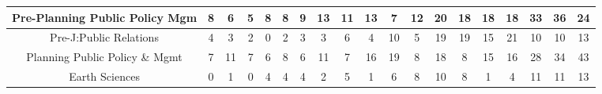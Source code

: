 \documentclass[10]{article}
\begin{document}
\begin{landscape}
\begin{longtable}[c]{|ccccccccccccccccccc|}
	\multicolumn{1}{|c|}{Pre-Planning Public Policy Mgm}             & \multicolumn{1}{c|}{8}          & \multicolumn{1}{c|}{6}          & \multicolumn{1}{c|}{5}          & \multicolumn{1}{c|}{8}          & \multicolumn{1}{c|}{8}          & \multicolumn{1}{c|}{9}          & \multicolumn{1}{c|}{13}         & \multicolumn{1}{c|}{11}         & \multicolumn{1}{c|}{13}         & \multicolumn{1}{c|}{7}          & \multicolumn{1}{c|}{12}         & \multicolumn{1}{c|}{20}         & \multicolumn{1}{c|}{18}         & \multicolumn{1}{c|}{18}         & \multicolumn{1}{c|}{18}         & \multicolumn{1}{c|}{33}         & \multicolumn{1}{c|}{36}         & 24         \\ \hline
	\multicolumn{1}{|c|}{Pre-J:Public Relations}                     & \multicolumn{1}{c|}{4}          & \multicolumn{1}{c|}{3}          & \multicolumn{1}{c|}{2}          & \multicolumn{1}{c|}{0}          & \multicolumn{1}{c|}{2}          & \multicolumn{1}{c|}{3}          & \multicolumn{1}{c|}{3}          & \multicolumn{1}{c|}{6}          & \multicolumn{1}{c|}{4}          & \multicolumn{1}{c|}{10}         & \multicolumn{1}{c|}{5}          & \multicolumn{1}{c|}{19}         & \multicolumn{1}{c|}{19}         & \multicolumn{1}{c|}{15}         & \multicolumn{1}{c|}{21}         & \multicolumn{1}{c|}{10}         & \multicolumn{1}{c|}{10}         & 13         \\ \hline
	\multicolumn{1}{|c|}{Planning Public Policy \& Mgmt}             & \multicolumn{1}{c|}{7}          & \multicolumn{1}{c|}{11}         & \multicolumn{1}{c|}{7}          & \multicolumn{1}{c|}{6}          & \multicolumn{1}{c|}{8}          & \multicolumn{1}{c|}{6}          & \multicolumn{1}{c|}{11}         & \multicolumn{1}{c|}{7}          & \multicolumn{1}{c|}{16}         & \multicolumn{1}{c|}{19}         & \multicolumn{1}{c|}{8}          & \multicolumn{1}{c|}{18}         & \multicolumn{1}{c|}{8}          & \multicolumn{1}{c|}{15}         & \multicolumn{1}{c|}{16}         & \multicolumn{1}{c|}{28}         & \multicolumn{1}{c|}{34}         & 43         \\ \hline
	\multicolumn{1}{|c|}{Earth Sciences}                             & \multicolumn{1}{c|}{0}          & \multicolumn{1}{c|}{1}          & \multicolumn{1}{c|}{0}          & \multicolumn{1}{c|}{4}          & \multicolumn{1}{c|}{4}          & \multicolumn{1}{c|}{4}          & \multicolumn{1}{c|}{2}          & \multicolumn{1}{c|}{5}          & \multicolumn{1}{c|}{1}          & \multicolumn{1}{c|}{6}          & \multicolumn{1}{c|}{8}          & \multicolumn{1}{c|}{10}         & \multicolumn{1}{c|}{8}          & \multicolumn{1}{c|}{1}          & \multicolumn{1}{c|}{4}          & \multicolumn{1}{c|}{11}         & \multicolumn{1}{c|}{11}         & 13         \\ \hline

\end{longtable}
\end{landscape}
\end{document}
